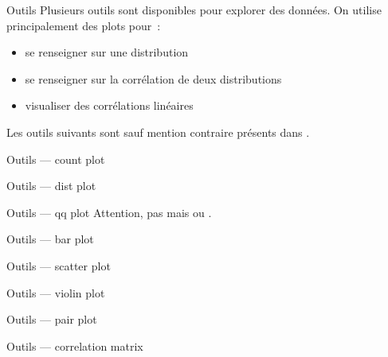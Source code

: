 \begin{frame}{Outils}
  Plusieurs outils sont disponibles pour explorer des données. On
  utilise principalement des plots pour :
  \begin{itemize}
  \item se renseigner sur une distribution
  \item se renseigner sur la corrélation de deux distributions
  \item visualiser des corrélations linéaires
  \end{itemize}
  Les outils suivants sont sauf mention contraire présents dans
  .
\end{frame}

\begin{frame}{Outils — count plot}
\end{frame}

\begin{frame}{Outils — dist plot}
\end{frame}

\begin{frame}{Outils — qq plot}
  Attention, pas 
  mais
  ou
  .
\end{frame}

\begin{frame}{Outils — bar plot}
\end{frame}

\begin{frame}{Outils — scatter plot}
\end{frame}

\begin{frame}{Outils — violin plot}
\end{frame}

\begin{frame}{Outils — pair plot}
\end{frame}

\begin{frame}{Outils — correlation matrix}
\end{frame}

